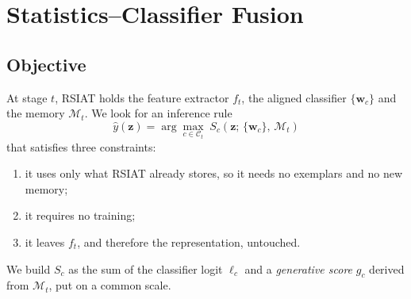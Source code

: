 \section{Statistics--Classifier Fusion}
\label{sec:method}

\subsection{Objective}
At stage $t$, RSIAT holds the feature extractor $f_t$, the aligned
classifier $\{\mathbf w_c\}$ and the memory $\mathcal M_t$. We look for an
inference rule
\begin{equation}
  \hat y(\mathbf z)=\arg\max_{c\in\mathcal C_t}\;S_c(\mathbf z;\,\{\mathbf w_c\},\,\mathcal M_t)
\end{equation}
that satisfies three constraints:
\begin{enumerate}
  \item it uses only what RSIAT already stores, so it needs no exemplars and
    no new memory;
  \item it requires no training;
  \item it leaves $f_t$, and therefore the representation, untouched.
\end{enumerate}
We build $S_c$ as the sum of the classifier logit $\ell_c$ and a
\emph{generative score} $g_c$ derived from $\mathcal M_t$, put on a common scale.

